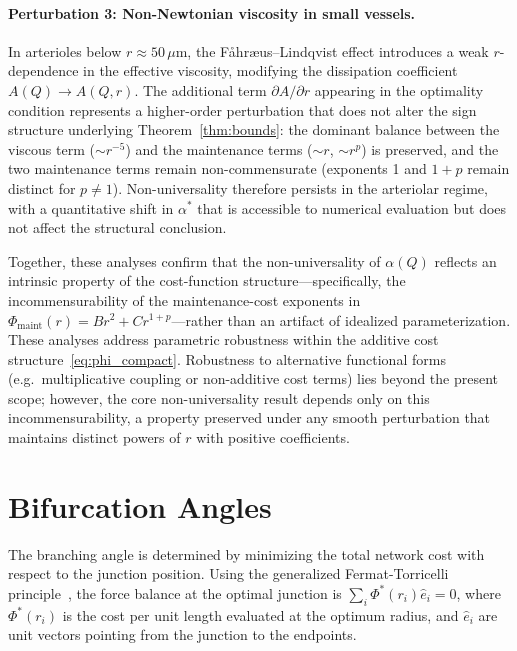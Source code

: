 \documentclass[11pt,a4paper]{article}
\theoremstyle{remark}
\begin{document}
\paragraph{Perturbation 3: Non-Newtonian viscosity in small vessels.}
In arterioles below $r \approx 50\,\mu\mathrm{m}$, the F\aa hr\ae us--Lindqvist
effect introduces a weak $r$-dependence in the effective viscosity, modifying
the dissipation coefficient $A(Q) \to A(Q,r)$. The additional term $\partial
A/\partial r$ appearing in the optimality condition represents a higher-order
perturbation that does not alter the sign structure underlying
Theorem~\ref{thm:bounds}: the dominant balance between the viscous term ($\sim
r^{-5}$) and the maintenance terms ($\sim r$, $\sim r^p$) is preserved, and the
two maintenance terms remain non-commensurate (exponents 1 and $1+p$ remain
distinct for $p \neq 1$). Non-universality therefore persists in the arteriolar
regime, with a quantitative shift in $\alpha^*$ that is accessible to numerical
evaluation but does not affect the structural conclusion.

Together, these analyses confirm that the non-universality of $\alpha(Q)$
reflects an intrinsic property of the cost-function structure---specifically,
the incommensurability of the maintenance-cost exponents in
$\Phi_{\mathrm{maint}}(r) = Br^2 + Cr^{1+p}$---rather than an artifact of
idealized parameterization. These analyses address parametric robustness
within the additive cost structure~\eqref{eq:phi_compact}. Robustness to
alternative functional forms (e.g.\ multiplicative coupling or non-additive
cost terms) lies beyond the present scope; however, the core non-universality
result depends only on this incommensurability, a property preserved under
any smooth perturbation that maintains distinct powers of $r$ with positive
coefficients.

\section{Bifurcation Angles}
\label{sec:angles}

The branching angle is determined by minimizing the total network cost with
respect to the junction position. Using the generalized Fermat-Torricelli
principle~\cite{Zamir1978,Zamir1999}, the force balance at the optimal junction
is $\sum_i \Phi^*(r_i)\hat{e}_i = 0$, where $\Phi^*(r_i)$ is the cost per unit
length evaluated at the optimum radius, and $\hat{e}_i$ are unit vectors
pointing from the junction to the endpoints.
\end{document}
